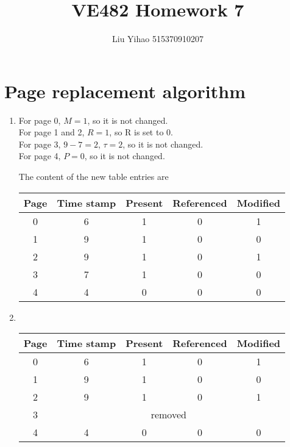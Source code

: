 \documentclass{article}
\title{VE482 Homework 7}
\author{Liu Yihao 515370910207}
\date{}
\begin{document}
\maketitle



\section{Page replacement algorithm}
\begin{enumerate}
\item
For page 0, $M=1$, so it is not changed.\\
For page 1 and 2, $R=1$, so R is set to 0.\\
For page 3, $9-7=2$, $\tau=2$, so it is not changed.\\
For page 4, $P=0$, so it is not changed.

The content of the new table entries are
\begin{center}
\begin{tabular}{ccccc}
\hline
Page & Time stamp & Present & Referenced & Modified \\\hline
0 & 6 & 1 & 0 & 1 \\
1 & 9 & 1 & 0 & 0 \\
2 & 9 & 1 & 0 & 1 \\
3 & 7 & 1 & 0 & 0 \\
4 & 4 & 0 & 0 & 0 \\
\hline
\end{tabular}
\end{center}
\item \
\begin{center}
\begin{tabular}{ccccc}
\hline
Page & Time stamp & Present & Referenced & Modified \\\hline
0 & 6 & 1 & 0 & 1 \\
1 & 9 & 1 & 0 & 0 \\
2 & 9 & 1 & 0 & 1 \\
3 & \multicolumn{4}{c}{removed} \\
4 & 4 & 0 & 0 & 0 \\
\hline
\end{tabular}
\end{center}
\end{enumerate}
\end{document}

